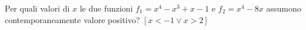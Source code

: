 
\begin{esercizio}[*]
 \label{ese:4.83}
Per quali valori di \( x \) le due funzioni \(f_1=x^4-x^3+x-1\) e \(f_2=x^4-8x\) 
assumono contemporaneamente valore positivo? \hfill \(\left[x<-1\vee x>2\right]\)
\end{esercizio}
